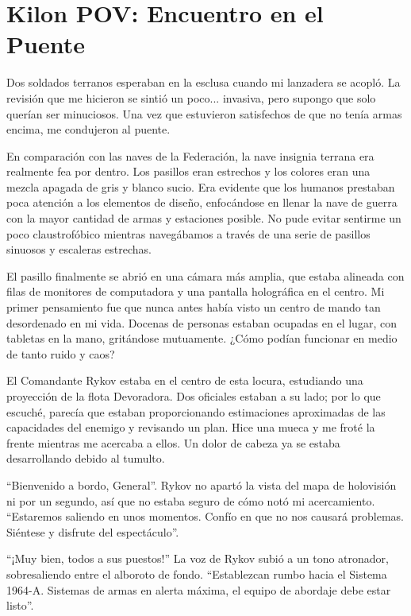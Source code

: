 \documentclass[spanish,12pt,a4paper,oneside,titlepage]{book}
\begin{document}
    \chapter{Kilon POV: Encuentro en el Puente}

    Dos soldados terranos esperaban en la esclusa cuando mi lanzadera se acopló. La revisión que me hicieron se sintió un poco... invasiva, pero supongo que solo querían ser minuciosos. Una vez que estuvieron satisfechos de que no tenía armas encima, me condujeron al puente.

    En comparación con las naves de la Federación, la nave insignia terrana era realmente fea por dentro. Los pasillos eran estrechos y los colores eran una mezcla apagada de gris y blanco sucio. Era evidente que los humanos prestaban poca atención a los elementos de diseño, enfocándose en llenar la nave de guerra con la mayor cantidad de armas y estaciones posible. No pude evitar sentirme un poco claustrofóbico mientras navegábamos a través de una serie de pasillos sinuosos y escaleras estrechas.

    El pasillo finalmente se abrió en una cámara más amplia, que estaba alineada con filas de monitores de computadora y una pantalla holográfica en el centro. Mi primer pensamiento fue que nunca antes había visto un centro de mando tan desordenado en mi vida. Docenas de personas estaban ocupadas en el lugar, con tabletas en la mano, gritándose mutuamente. ¿Cómo podían funcionar en medio de tanto ruido y caos?

    El Comandante Rykov estaba en el centro de esta locura, estudiando una proyección de la flota Devoradora. Dos oficiales estaban a su lado; por lo que escuché, parecía que estaban proporcionando estimaciones aproximadas de las capacidades del enemigo y revisando un plan. Hice una mueca y me froté la frente mientras me acercaba a ellos. Un dolor de cabeza ya se estaba desarrollando debido al tumulto.

    “Bienvenido a bordo, General”. Rykov no apartó la vista del mapa de holovisión ni por un segundo, así que no estaba seguro de cómo notó mi acercamiento. ``Estaremos saliendo en unos momentos. Confío en que no nos causará problemas. Siéntese y disfrute del espectáculo''.

    ``¡Muy bien, todos a sus puestos!'' La voz de Rykov subió a un tono atronador, sobresaliendo entre el alboroto de fondo. ``Establezcan rumbo hacia el Sistema 1964-A. Sistemas de armas en alerta máxima, el equipo de abordaje debe estar listo''.
\end{document}
